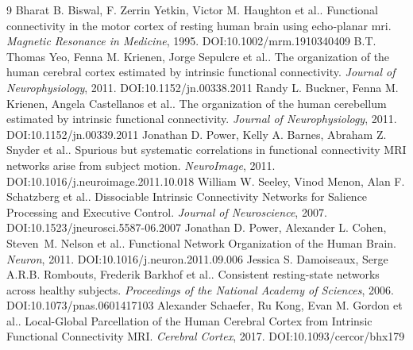 \documentclass[11pt]{article}
\begin{document}
\begin{thebibliography}{9}
 Bharat B. Biswal, F. Zerrin Yetkin, Victor M. Haughton et al.. Functional connectivity in the motor cortex of resting human brain using echo‐planar mri. \emph{Magnetic Resonance in Medicine}, 1995. DOI:10.1002/mrm.1910340409
 B.T. Thomas Yeo, Fenna M. Krienen, Jorge Sepulcre et al.. The organization of the human cerebral cortex estimated by intrinsic functional connectivity. \emph{Journal of Neurophysiology}, 2011. DOI:10.1152/jn.00338.2011
 Randy L. Buckner, Fenna M. Krienen, Angela Castellanos et al.. The organization of the human cerebellum estimated by intrinsic functional connectivity. \emph{Journal of Neurophysiology}, 2011. DOI:10.1152/jn.00339.2011
 Jonathan D. Power, Kelly A. Barnes, Abraham Z. Snyder et al.. Spurious but systematic correlations in functional connectivity MRI networks arise from subject motion. \emph{NeuroImage}, 2011. DOI:10.1016/j.neuroimage.2011.10.018
 William W. Seeley, Vinod Menon, Alan F. Schatzberg et al.. Dissociable Intrinsic Connectivity Networks for Salience Processing and Executive Control. \emph{Journal of Neuroscience}, 2007. DOI:10.1523/jneurosci.5587-06.2007
 Jonathan D. Power, Alexander L. Cohen, Steven M. Nelson et al.. Functional Network Organization of the Human Brain. \emph{Neuron}, 2011. DOI:10.1016/j.neuron.2011.09.006
 Jessica S. Damoiseaux, Serge A.R.B. Rombouts, Frederik Barkhof et al.. Consistent resting-state networks across healthy subjects. \emph{Proceedings of the National Academy of Sciences}, 2006. DOI:10.1073/pnas.0601417103
 Alexander Schaefer, Ru Kong, Evan M. Gordon et al.. Local-Global Parcellation of the Human Cerebral Cortex from Intrinsic Functional Connectivity MRI. \emph{Cerebral Cortex}, 2017. DOI:10.1093/cercor/bhx179
\end{thebibliography}
\end{document}
